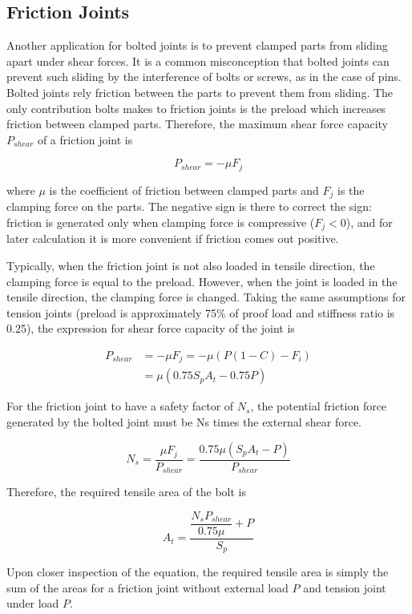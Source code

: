 \documentclass[a4paper,openany,12pt]{book}
\begin{document}
{{\subsection{Friction Joints}
\label{friction-joints}
Another application for bolted joints is to prevent clamped parts from
sliding apart under shear forces. It is a common misconception that
bolted joints can prevent such sliding by the interference of bolts or
screws, as in the case of pins. Bolted joints rely friction between the
parts to prevent them from sliding. The only contribution bolts makes to
friction joints is the preload which increases friction between clamped
parts. Therefore, the maximum shear force capacity \(P_{shear}\) of a
friction joint is


$$P_{shear} = -\mu F_j$$

where \(\mu\) is the coefficient of friction between clamped parts and
\(F_j\) is the clamping force on the parts. The negative sign is there to
correct the sign: friction is generated only when clamping force is
compressive (\(F_j < 0\)), and for later calculation it is more convenient
if friction comes out positive.

Typically, when the friction joint is not also loaded in tensile
direction, the clamping force is equal to the preload. However, when the
joint is loaded in the tensile direction, the clamping force is changed.
Taking the same assumptions for tension joints (preload is approximately
75\% of proof load and stiffness ratio is 0.25), the expression for shear
force capacity of the joint is

$$\begin{aligned}
  P_{shear} &= -\mu F_j = -\mu \left( P(1 - C) - F_i \right) \\
            &= \mu (0.75S_pA_t - 0.75P)\end{aligned}$$

For the friction joint to have a safety factor of \(N_s\), the potential
friction force generated by the bolted joint must be Ns times the
external shear force.

$$N_s = \frac{\mu F_j}{P_{shear}} = \frac{0.75\mu (S_pA_t - P)}{P_{shear}}$$

Therefore, the required tensile area of the bolt is

$$A_t = \frac{\dfrac{N_s P_{shear}}{0.75\mu } + P}{S_p}$$

Upon closer inspection of the equation, the required tensile area is
simply the sum of the areas for a friction joint without external load
\(P\) and tension joint under load \(P\).

}}
\end{document}
